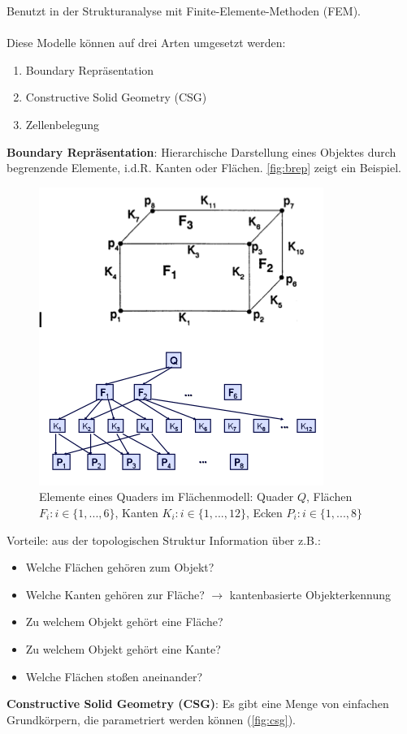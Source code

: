 Benutzt in der Strukturanalyse mit Finite-Elemente-Methoden (FEM).\\ \\
Diese Modelle können auf drei Arten umgesetzt werden:
\begin{enumerate}
\item Boundary Repräsentation
\item Constructive Solid Geometry (CSG)
\item Zellenbelegung
\end{enumerate}
\textbf{Boundary Repräsentation}: Hierarchische Darstellung eines Objektes durch begrenzende
Elemente, i.d.R. Kanten oder Flächen. \autoref{fig:brep} zeigt ein Beispiel.\\
\begin{figure}[h!]
	\centering 
	\includegraphics[width=0.3\linewidth]{figures/ch02_brep.png}
	\caption{Elemente eines Quaders im Flächenmodell: Quader $Q$, Flächen $F_i : i \in \{1,...,6\}$, Kanten $K_i : i \in \{1,...,12\}$, Ecken $P_i : i \in \{1,...,8\}$}
\label{fig:brep}
\end{figure}
Vorteile: aus der topologischen Struktur Information über z.B.:
\begin{itemize}
\item Welche Flächen gehören zum Objekt?
\item Welche Kanten gehören zur Fläche? $\rightarrow$ kantenbasierte Objekterkennung
\item Zu welchem Objekt gehört eine Fläche?
\item Zu welchem Objekt gehört eine Kante?
\item Welche Flächen stoßen aneinander?
\end{itemize}
\noindent
\textbf{Constructive Solid Geometry (CSG)}:
Es gibt eine Menge von einfachen Grundkörpern, die parametriert
werden können (\autoref{fig:csg}). 
